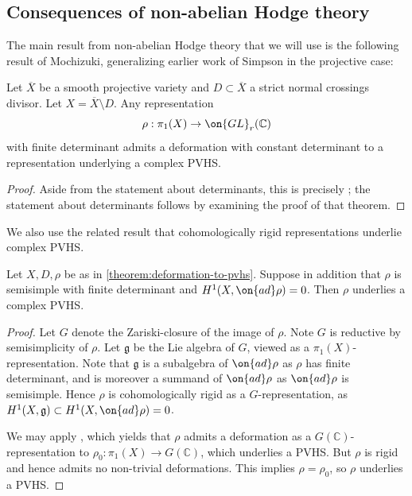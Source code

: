 \subsection{Consequences of non-abelian Hodge theory}
The main result from non-abelian Hodge theory that we will use is the following result of Mochizuki, generalizing earlier work of Simpson in the projective case:
\begin{theorem}
\notready
	\label{theorem:deformation-to-pvhs}
	Let $\overline{X}$ be a smooth projective variety and $D\subset
	\overline{X}$ a strict normal crossings divisor. Let
	$X=\overline{X}\setminus D$.
	Any representation $$\rho: \pi_1(X)\to
	\on{GL}_r(\mathbb{C})$$ with finite determinant admits a
	deformation with constant determinant to a representation underlying a complex PVHS.
\end{theorem}
\begin{proof}
Aside from the statement about determinants, this is precisely	\cite[Theorem 10.5]{mochizuki2006kobayashi}; the statement about determinants follows by examining the proof of that theorem.
\end{proof}

We also use the related result that cohomologically rigid representations underlie complex PVHS.
\begin{lemma}
\notready\label{lemma:rigid-reps}
Let $X, D, \rho$ be as in \autoref{theorem:deformation-to-pvhs}. Suppose in
addition that $\rho$ is semisimple with finite determinant and $H^1(X, \on{ad}\rho)=0$. Then $\rho$ underlies a complex PVHS.
\end{lemma}
\begin{proof}
	Let $G$ denote the Zariski-closure of the image of $\rho$.
	Note $G$ is reductive by semisimplicity of $\rho$. Let $\mathfrak{g}$ be
	the Lie algebra of $G$, viewed as a $\pi_1(X)$-representation. Note
	that $\mathfrak{g}$ is a subalgebra of $\on{ad}\rho$ as $\rho$ has
	finite determinant, and is moreover a summand of $\on{ad}\rho$ as
	$\on{ad}\rho$ is semisimple. Hence $\rho$ is cohomologically rigid as a
	$G$-representation, as $H^1(X, \mathfrak{g}) \subset H^1(X, \on{ad}
	\rho) =0$.

	We may apply \cite[Lemma 10.13]{mochizuki2006kobayashi},
	which yields that
	$\rho$ admits a deformation as a $G(\mathbb C)$-representation to
	$\rho_0: \pi_1(X) \to G(\mathbb C)$, which
	underlies a PVHS.
	But
	$\rho$ is rigid and hence admits no
	non-trivial deformations.	This implies $\rho = \rho_0$, so $\rho$ underlies a PVHS.
\end{proof}
